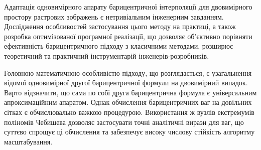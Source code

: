 Адаптація одновимірного апарату барицентричної інтерполяції для двовимірного простору растрових зображень є нетривіальним інженерним завданням. Дослідження особливостей застосування цього методу на практиці, а також розробка оптимізованої програмної реалізації, що дозволяє об'єктивно порівняти ефективність барицентричного підходу з класичними методами, розширює теоретичний та практичний інструментарій інженерів-розробників.

Головною математичною особливістю підходу, що розглядається, є узагальнення відомої одновимірної другої барицентричної формули на двовимірний випадок. Варто відзначити, що сама по собі друга барицентрична формула є універсальним апроксимаційним апаратом. Однак обчислення барицентричних ваг на довільних сітках є обчислювально важкою процедурою. Використання ж вузлів екстремумів поліномів Чебишева дозволяє застосувати точні аналітичні вирази для ваг, що суттєво спрощує ці обчислення та забезпечує високу числову стійкість алгоритму масштабування.